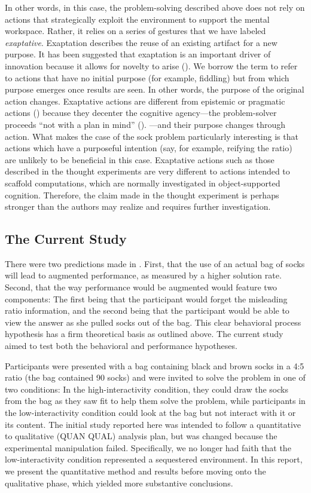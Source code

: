 In other words, in this case, the problem-solving described above does not rely on actions that strategically exploit the environment to support the mental workspace. Rather, it relies on a series of gestures that we have labeled \emph{exaptative}. Exaptation describes the reuse of an existing artifact for a new purpose. It has been suggested that exaptation is an important driver of innovation because it allows for novelty to arise (). We borrow the term to refer to actions that have no initial purpose (for example, fiddling) but from which purpose emerges once results are seen. In other words, the purpose of the original action changes. Exaptative actions are different from epistemic or pragmatic actions () because they decenter the cognitive agency---the problem-solver proceeds ``not with a plan in mind'' (). ---and their purpose changes through action. What makes the case of the sock problem particularly interesting is that actions which have a purposeful intention (say, for example, reifying the ratio) are unlikely to be beneficial in this case. Exaptative actions such as those described in the thought experiments are very different to actions intended to scaffold computations, which are normally investigated in object-supported cognition. Therefore, the claim made in the thought experiment is perhaps stronger than the authors may realize and requires further investigation.


\subsection{The Current Study}

There were two predictions made in \textcite{Vallée-Tourangeau2020}.
First, that the use of an actual bag of socks will lead to augmented performance, as measured by a higher solution rate. Second, that the way performance would be augmented would feature two components: The first being that the participant would forget the misleading ratio information, and the second being that the participant would be able to view the answer as she pulled socks out of the bag. This clear behavioral process hypothesis has a firm theoretical basis as outlined above. The current study aimed to test both the behavioral and performance hypotheses.

Participants were presented with a bag containing black and brown socks in a 4:5 ratio (the bag contained 90 socks) and were invited to solve the problem in one of two conditions: In the high-interactivity condition, they could draw the socks from the bag as they saw fit to help them solve the problem, while participants in the low-interactivity condition could look at the bag but not interact with it or its content.
The initial study reported here was intended to follow a quantitative to qualitative (QUAN QUAL) analysis plan, but was changed because the experimental manipulation failed. Specifically, we no longer had faith that the low-interactivity condition represented a sequestered environment. In this report, we present the quantitative method and results before moving onto the qualitative phase, which yielded more substantive conclusions.

